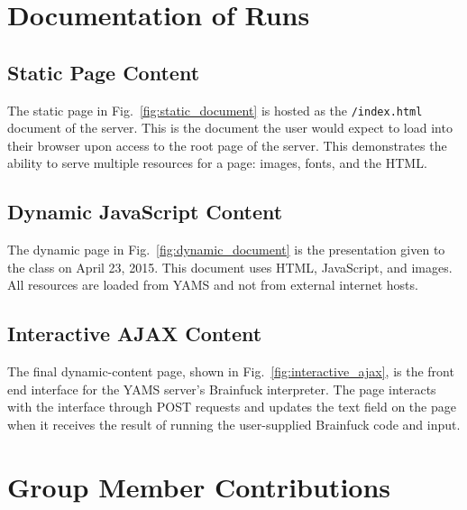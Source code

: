 \documentclass[journal,10pt]{IEEEtran}
\begin{document}
\section{Documentation of Runs}

\subsection{Static Page Content}

The static page in Fig.~\ref{fig:static_document} is hosted as the
\texttt{/index.html} document of the server. This is the document the user would
expect to load into their browser upon access to the root page of the server.
This demonstrates the ability to serve multiple resources for a page: images,
fonts, and the HTML.

\subsection{Dynamic JavaScript Content}

The dynamic page in Fig.~\ref{fig:dynamic_document} is the presentation given to
the class on April 23, 2015. This document uses HTML, JavaScript, and images.
All resources are loaded from YAMS and not from external internet hosts.

\subsection{Interactive AJAX Content}

The final dynamic-content page, shown in Fig.~\ref{fig:interactive_ajax}, is the
front end interface for the YAMS server's Brainfuck\cite{Mpreu/preller}
interpreter. The page interacts with the interface through POST requests and
updates the text field on the page when it receives the result of running the
user-supplied Brainfuck code and input.

\section{Group Member Contributions}
\end{document}
